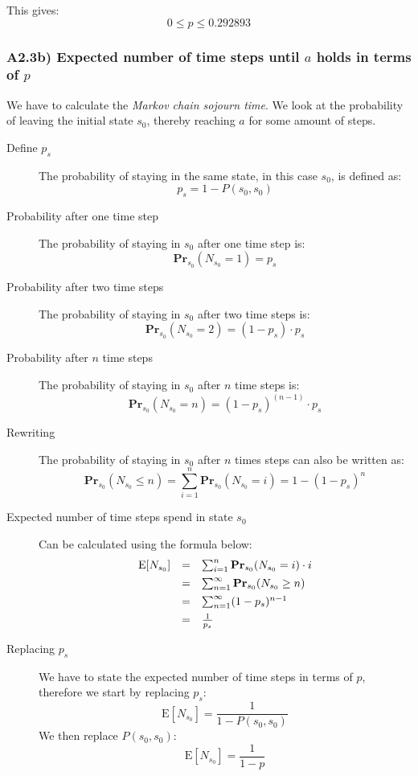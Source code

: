\documentclass[12pt]{report}
\begin{document}
This gives:
$$0 \leq p \leq 0.292893$$

\subsubsection*{A2.3b) Expected number of time steps until $a$ holds in terms of $p$}
We have to calculate the \emph{Markov chain sojourn time}. We look at the probability of leaving the initial state $s_0$, thereby reaching $a$ for some amount of steps.

\begin{description}
	\item[Define $p_s$] The probability of staying in the same state, in this case $s_0$, is defined as:
	$$p_s = 1 - P(s_0, s_0)$$
	
	\item[Probability after one time step] The probability of staying in $s_0$ after one time step is:
	$$\mathrm{\textbf{Pr}}_{s_0}(N_{s_0}=1)=p_s$$
	
	\item[Probability after two time steps] The probability of staying in $s_0$ after two time steps is:
	$$\mathrm{\textbf{Pr}}_{s_0}(N_{s_0}=2)=(1-p_s) \cdot p_s$$
	
	\item[Probability after $n$ time steps] The probability of staying in $s_0$ after $n$ time steps is:
	$$\mathrm{\textbf{Pr}}_{s_0}(N_{s_0}=n)=(1-p_s)^{(n-1)} \cdot p_s$$
	
	\item[Rewriting] The probability of staying in $s_0$ after $n$ times steps can also be written as:
	$$\mathrm{\textbf{Pr}}_{s_0}(N_{s_0} \leq n) = \sum_{i=1}^{n} \mathrm{\textbf{Pr}}_{s_0}(N_{s_0} = i)  = 1 - (1-p_s)^n$$
	
	\item[Expected number of time steps spend in state $s_0$] Can be calculated using the formula below:
	$$\begin{array}{r c l}
	\mathrm{E}[N_{s_0}] & = & \sum_{i=1}^{n} \mathrm{\textbf{Pr}}_{s_0}(N_{s_0} = i)\cdot i\\[0.15cm]
	& = & \sum_{n=1}^{\infty} \mathrm{\textbf{Pr}}_{s_0}(N_{s_0} \geq n)\\[0.15cm]
	& = & \sum_{n=1}^{\infty} (1-p_s)^{n-1}\\[0.15cm]
	& = & \frac{1}{p_s}
	\end{array}$$
	
	\item[Replacing $p_s$] We have to state the expected number of time steps in terms of $p$, therefore we start by replacing $p_s$:
	$$\mathrm{E}[N_{s_0}] = \frac{1}{1 - P(s_0,s_0)}$$
	We then replace $P(s_0,s_0)$:
	$$\mathrm{E}[N_{s_0}] = \frac{1}{1 - p}$$
\end{description}
\end{document}
